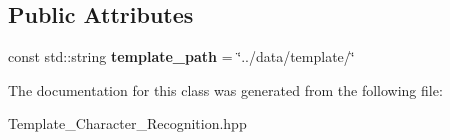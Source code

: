 \subsection*{Public Attributes}
\begin{DoxyCompactItemize}
\item 
\mbox{\label{class_template___character___recognition_aa4cb4d3779f7d7a65ae5811f78be880b}} 
const std\+::string {\bfseries template\+\_\+path} = \char`\"{}../data/template/\char`\"{}
\end{DoxyCompactItemize}


The documentation for this class was generated from the following file\+:\begin{DoxyCompactItemize}
\item 
Template\+\_\+\+Character\+\_\+\+Recognition.\+hpp\end{DoxyCompactItemize}
